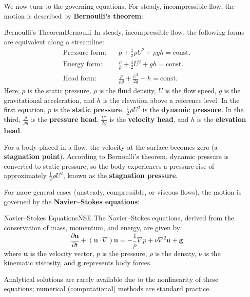 \documentclass[uplatex,dvipdfmx,a4paper,11pt]{report}
\newcommand{\keyword}[1]{\textcolor{mainblue}{\textbf{#1}}}
\numberwithin{equation}{chapter}
\begin{document}
\enskip

We now turn to the governing equations. For steady, incompressible flow, the motion is described by \keyword{Bernoulli's theorem}:
\begin{definition}{Bernoulli's Theorem}{Bernoulli}{}
  In steady, incompressible flow, the following forms are equivalent along a streamline:
  \begin{equation}
  \begin{aligned}
  \text{Pressure form}:      &\quad p + \frac{1}{2}\rho U^{2} + \rho g h = \mathrm{const.}\\
  \text{Energy form}:&\quad \frac{p}{\rho} + \frac{1}{2} U^{2} + g h = \mathrm{const.}\\
  \text{Head form}:      &\quad \frac{p}{\rho g} + \frac{U^{2}}{2g} + h = \mathrm{const.}
  \end{aligned}
  \end{equation}
  Here, $p$ is the static pressure, $\rho$ is the fluid density, $U$ is the flow speed, $g$ is the gravitational acceleration, and $h$ is the elevation above a reference level.
  In the first equation, $p$ is the \keyword{static pressure}, $\frac{1}{2}\rho U^{2}$ is the \keyword{dynamic pressure}. In the third, $\frac{p}{\rho g}$ is the \keyword{pressure head}, $\frac{U^{2}}{2g}$ is the \keyword{velocity head}, and $h$ is the \keyword{elevation head}.
\end{definition}

For a body placed in a flow, the velocity at the surface becomes zero (a \keyword{stagnation point}). According to Bernoulli's theorem, dynamic pressure is converted to static pressure, so the body experiences a pressure rise of approximately $\frac{1}{2}\rho U^{2}$, known as the \keyword{stagnation pressure}.

\enskip

For more general cases (unsteady, compressible, or viscous flows), the motion is governed by the \keyword{Navier--Stokes equations}:
\begin{definition}{Navier--Stokes Equations}{NSE}{}
  The Navier--Stokes equations, derived from the conservation of mass, momentum, and energy, are given by:
  \begin{equation}
  \frac{\partial \mathbf{u}}{\partial t} + (\mathbf{u} \cdot \nabla) \mathbf{u} = -\frac{1}{\rho} \nabla p + \nu \nabla^{2} \mathbf{u} + \mathbf{g}
  \end{equation}
  where $\mathbf{u}$ is the velocity vector, $p$ is the pressure, $\rho$ is the density, $\nu$ is the kinematic viscosity, and $\mathbf{g}$ represents body forces.
\end{definition}
Analytical solutions are rarely available due to the nonlinearity of these equations; numerical (computational) methods are standard practice.
\end{document}
